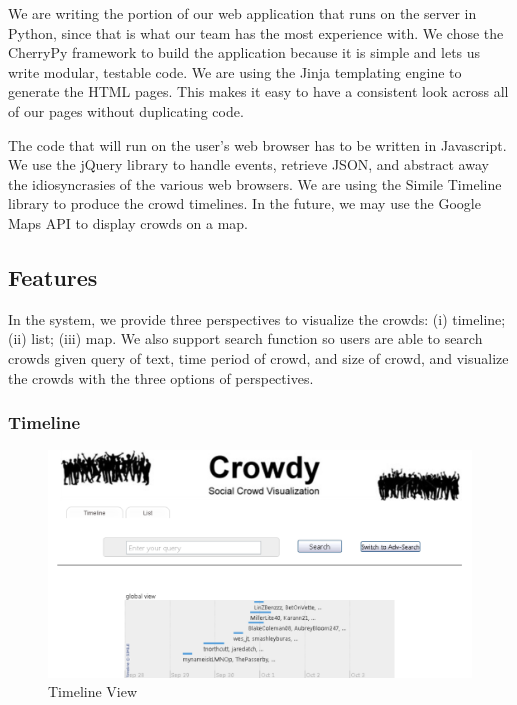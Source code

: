 \documentclass{sig-alternate}
\begin{document}
We are writing the portion of our web application that runs on the server in
Python, since that is what our team has the most experience with. We chose the
CherryPy framework to build the application because it is simple and lets us
write modular, testable code. We are using the Jinja templating engine to
generate the HTML pages. This makes it easy to have a consistent look across
all of our pages without duplicating code.

The code that will run on the user's web browser has to be written in
Javascript. We use the jQuery library to handle events, retrieve JSON, and
abstract away the idiosyncrasies of the various web browsers. We are using the
Simile Timeline library \cite{simile} to produce the crowd timelines. In the 
future, we may use the Google Maps API to display crowds on a map.

\subsection{Features}

In the system, we provide three perspectives to visualize the crowds: (i) timeline;
(ii) list; (iii) map. We also support search function so users are able to search 
crowds given query of text, time period of crowd, and size of crowd, and visualize
the crowds with the three options of perspectives.

\subsubsection{Timeline}

\begin{figure}
\centering
\includegraphics[width=\linewidth]{imgs/TimeLineView.png}
\caption{Timeline View}
\label{fig:TimelineView}
\end{figure}
\end{document}
